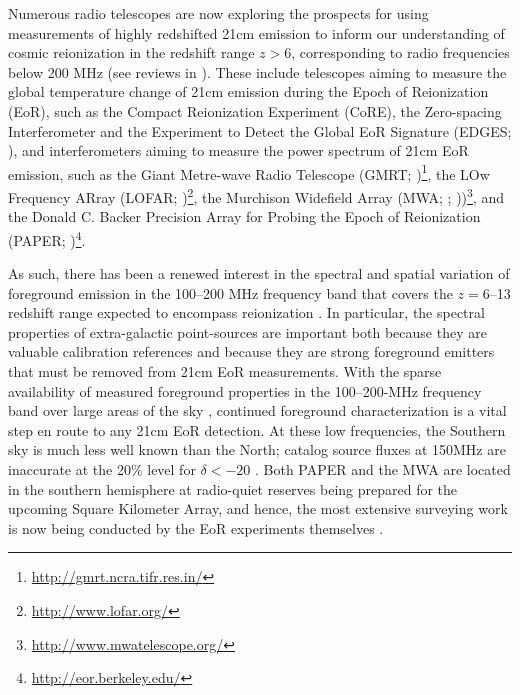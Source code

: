 \documentclass[preprint]{aastex}
\begin{document}
Numerous radio telescopes are now exploring the prospects for using
measurements of highly redshifted 21cm emission to inform our understanding of
cosmic reionization in the redshift range $z>6$, corresponding to radio
frequencies below 200 MHz (see reviews in
\citealt{Furlanetto:2006p2267,Morales:2010p8093,Pritchard:2012p9555}).  These
include telescopes aiming to measure the global temperature change of 21cm
emission during the Epoch of Reionization (EoR), such as the Compact
Reionization Experiment (CoRE), the Zero-spacing Interferometer \citep{Raghunathan:2011}  and the Experiment to Detect the Global EoR
Signature (EDGES; \citealt{Bowman:2010p8546}), and interferometers aiming to
measure the power spectrum of 21cm EoR emission, such as the Giant Metre-wave
Radio Telescope (GMRT;
\citealt{Paciga:2011p9470,Paciga:2013p9627})\footnote{\url{http://gmrt.ncra.tifr.res.in/}},
the LOw Frequency ARray (LOFAR;
\citealt{Yatawatta:2013p9699})\footnote{\url{http://www.lofar.org/}}, the
Murchison Widefield Array (MWA;  \citealt{Bowman:2012p9138};
\citealt{Tingay:2013p9022}))\footnote{\url{http://www.mwatelescope.org/}}, and
the Donald C. Backer Precision Array for Probing the Epoch of Reionization
(PAPER; \citealt{Parsons:2010p6757,Pober:2013p9567})\footnote{\url{http://eor.berkeley.edu/}}.

As such, there has been a renewed interest in the spectral and spatial variation of
foreground emission in the 100--200 MHz frequency band that covers
the $z=6$--13 redshift range expected to encompass reionization
\citep{Furlanetto:2006p2267}. %
In particular, the spectral properties of extra-galactic point-sources are important
both because they are valuable calibration references
and because they are strong foreground emitters that must be removed from 21cm EoR measurements.
With the sparse availability of measured foreground properties in the
100--200-MHz frequency band over large areas of the sky \citep{deOliveiraCosta:2008p2242}, continued
foreground characterization is a
vital step en route to any 21cm EoR detection.
At these low
frequencies, the Southern sky is much less well known than the North;
catalog source fluxes at 150MHz are inaccurate at the 20\% level
for $\delta<-20$\arcdeg{} \citep{Slee:1995p7541,Vollmer:2005p6425}.
Both PAPER and the MWA are located in the southern hemisphere at radio-quiet
reserves being prepared for the upcoming Square Kilometer Array, and hence,
the
most extensive surveying work is now being conducted by the EoR experiments
themselves \citep{Jacobs:2011p8438,Williams:2012p8768,Bernardi:2013p9859}.
\end{document}
